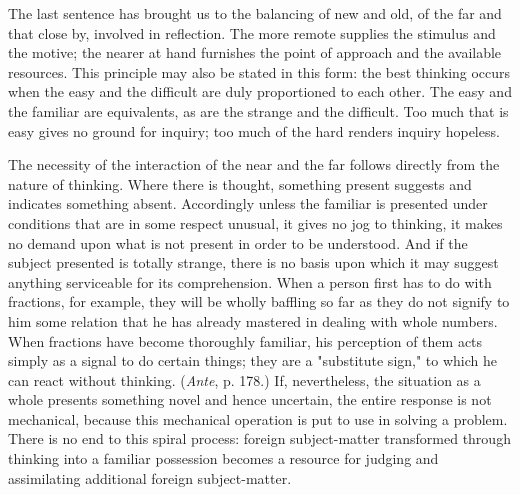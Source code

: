 \documentclass[letterpaper]{book}
\begin{document}
The last sentence has brought us to the balancing of new and old, of the
far and that close by, involved in reflection. The more remote supplies
the stimulus and the motive; the nearer at hand furnishes the point of
approach and the available resources. This principle may also be stated
in this form: the best thinking occurs when the easy and the difficult
are duly proportioned to each other. The easy and the familiar are
equivalents, as are the strange and the difficult. Too much that is easy
gives no ground for inquiry; too much of the hard renders inquiry
hopeless.


The necessity of the interaction of the near and the far follows
directly from the nature of thinking. Where there is thought, something
present suggests and indicates something absent. Accordingly unless the
familiar
is presented under conditions that are in some respect unusual, it gives
no jog to thinking, it makes no demand upon what is not present in order
to be understood. And if the subject presented is totally strange, there
is no basis upon which it may suggest anything serviceable for its
comprehension. When a person first has to do with fractions, for
example, they will be wholly baffling so far as they do not signify to
him some relation that he has already mastered in dealing with whole
numbers. When fractions have become thoroughly familiar, his perception
of them acts simply as a signal to do certain things; they are a
"substitute sign," to which he can react without thinking. (\emph{Ante},
p. 178.) If, nevertheless, the situation as a whole presents something
novel and hence uncertain, the entire response is not mechanical,
because this mechanical operation is put to use in solving a problem.
There is no end to this spiral process: foreign subject-matter
transformed through thinking into a familiar possession becomes a
resource for judging and assimilating additional foreign subject-matter.

\end{document}
